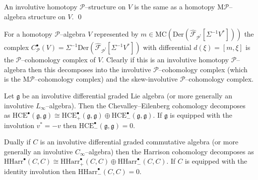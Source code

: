 \documentclass[british]{amsart}
\theoremstyle{plain}
\theoremstyle{definition}
{
\newaliascnt{{definition}}{theorem}\newtheorem{{definition}}[{definition}]{{Definition}}\aliascntresetthe{{definition}}\expandafterautorefname\endcsname{{Definition}}}
{
\newaliascnt{{remark}}{theorem}\newtheorem{{remark}}[{remark}]{{Remark}}\aliascntresetthe{{remark}}\expandafterautorefname\endcsname{{Remark}}}
{
\newaliascnt{{example}}{theorem}\newtheorem{{example}}[{example}]{{Example}}\aliascntresetthe{{example}}\expandafterautorefname\endcsname{{Example}}}
{
\newaliascnt{{examples}}{theorem}\newtheorem{{examples}}[{examples}]{{Examples}}\aliascntresetthe{{examples}}\expandafterautorefname\endcsname{{Examples}}}
{
\newaliascnt{{notation}}{theorem}\newtheorem{{notation}}[{notation}]{{Notation}}\aliascntresetthe{{notation}}\expandafterautorefname\endcsname{{Notation}}}
{
\newaliascnt{{convention}}{theorem}\newtheorem{{convention}}[{convention}]{{Convention}}\aliascntresetthe{{convention}}\expandafterautorefname\endcsname{{Convention}}}
\numberwithin{equation}{section}
\numberwithin{figure}{section}
\begin{document}
\begin{corollary}
An involutive homotopy $\mathcal{P}$--structure on $V$ is the same as a homotopy ${\mathrm{M}}\mathcal{P}$--algebra structure on $V$.
\qed
\end{corollary}

For a homotopy $\mathcal{P}$--algebra $V$ represented by $m\in{\mathrm{MC}}({\mathrm{Der}}({\widehat{\mathcal{F}}_{{\mathcal{P}^!}}[{\Sigma^{-1}V^*}]}))$ the complex $C^\bullet_\mathcal{P}(V) = \Sigma^{-1}{\mathrm{Der}}({\widehat{\mathcal{F}}_{{\mathcal{P}^!}}[{\Sigma^{-1}V^*}]})$ with differential $d(\xi)=[m,\xi]$ is the $\mathcal{P}$--cohomology complex of $V$. Clearly if this is an involutive homotopy $\mathcal{P}$--algebra then this decomposes into the involutive $\mathcal{P}$--cohomology complex (which is the ${\mathrm{M}}\mathcal{P}$--cohomology complex) and the skew-involutive $\mathcal{P}$--cohomology complex.

\begin{example}
Let $\mathfrak{g}$ be an involutive differential graded Lie algebra (or more generally an involutive $L_\infty$--algebra). Then the Chevalley--Eilenberg cohomology decomposes as ${\mathrm{HCE}}^\bullet(\mathfrak{g},\mathfrak{g})\cong{\mathrm{HCE}}^\bullet_+(\mathfrak{g},\mathfrak{g})\oplus{\mathrm{HCE}}^\bullet_-(\mathfrak{g},\mathfrak{g})$. If $\mathfrak{g}$ is equipped with the involution $v^*=-v$ then ${\mathrm{HCE}}^\bullet_-(\mathfrak{g},\mathfrak{g})=0$.

 Dually if $C$ is an involutive differential graded commutative algebra (or more generally an involutive $C_\infty$--algebra) then the Harrison cohomology decomposes as ${\mathrm{HHarr}}^\bullet(C,C) \cong {\mathrm{HHarr}}^\bullet_+(C,C)\oplus {\mathrm{HHarr}}^\bullet_-(C,C)$. If $C$ is equipped with the identity involution then ${\mathrm{HHarr}}^\bullet_-(C,C)=0$.
\end{example}



\end{document}
